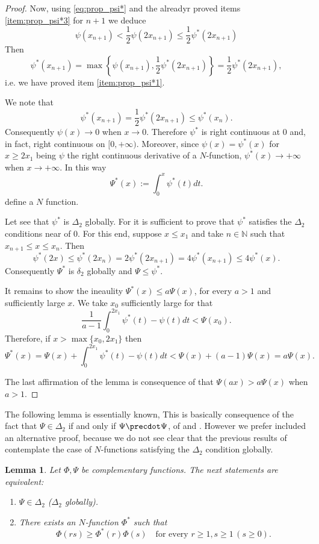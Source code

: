 \documentclass[twoside]{article}
\newtheorem{lem}[thm]{Lemma}
\theoremstyle{remark}
\renewcommand{\leq}{\leqslant}
\renewcommand{\geq}{\geqslant}
\begin{document}
\begin{proof}
Now, using \eqref{eq:prop_psi*} and the alreadyr proved items \ref{item:prop_psi*3} for $n+1$ we deduce
\[\psi(x_{n+1})<\frac12\psi(2x_{n+1})\leq \frac12\psi^*(2x_{n+1}) \]
Then
\[\psi^*(x_{n+1})=\max\left\{\psi(x_{n+1}),\frac12\psi^*(2x_{n+1}) \right\}=\frac12\psi^*(2x_{n+1}),\]
i.e. we have proved item \ref{item:prop_psi*1}.

We note that
\[\psi^*(x_{n+1})=\frac12\psi^*(2x_{n+1})\leq\psi^*(x_{n}).\]
Consequently $\psi(x)\to 0$ when $x\to 0$. Therefore $\psi^*$ is right continuous at $0$ and, in fact, right continuous on $[0,+\infty)$. Moreover, since $\psi(x)=\psi^*(x)$ for $x\geq 2x_1$ being $\psi$ the right continuous derivative of a $N$-function, $\psi^*(x)\to +\infty$ when $x\to +\infty$. In this way
\[\Psi^*(x):=\int_0^x\psi^*(t)dt.\]
define a $N$ function.

Let  see that $\psi^*$ is $\Delta_2$ globally.
For it is sufficient to prove that $\psi^*$ satisfies the $ \Delta_2$ conditions near of $0$. For this end, suppose $x\leq x_1$ and take $n\in\mathbb{N}$ such that $x_{n+1}\leq x\leq x_n$. Then
\[\psi^*(2x)\leq \psi^*(2x_n)=2\psi^*(2x_{n+1})=4\psi^*(x_{n+1})\leq 4\psi^*(x).\]
Consequently $\Psi^*$ is $\delta_2$ globally and $\Psi\leq \psi^*$.

It remains to show the ineaulity $\Psi^*(x)\leq a\Psi(x)$, for every $a>1$ and sufficiently large $x$. We take $x_0$ sufficiently large for that
\[\frac{1}{a-1}\int_0^{2x_1}\psi^*(t)-\psi(t)dt<\Psi(x_0).\]
Therefore, if  $x>\max\{x_0,2x_1\}$ then
\[\Psi^*(x)=\Psi(x)+\int_0^{2x_1}\psi^*(t)-\psi(t)dt<\Psi(x)+(a-1)\Psi(x)= a\Psi(x).\]

The last affirmation of the lemma is consequence of that  $\Psi(ax)>a\Psi(x)$ when $a>1$. 

\end{proof}



The following lemma is essentially known,  This is basically consequence  of the fact that $\Psi\in\Delta_2$ if and only if $\Psi\precdot\Psi$, of  \cite[Prop. 4, p. 20]{rao1991theory} and \cite[Cor. 10, p. 30]{rao1991theory}. However we prefer included an alternative proof, because we do not see clear that the previous results of \cite{rao1991theory} contemplate the case of $N$-functions satisfying the $\Delta_2$ condition globally.



\begin{lem}\label{lem:submultipliativa}
Let $\Phi,\Psi$ be complementary functions.
The next statements are equivalent:
\begin{enumerate}
\item\label{item1} $\Psi \in \Delta_2$ ($\Delta_2$ globally).
\item\label{item2} There exists an $N$-function $\Phi^*$ such that
\begin{equation}\label{eq:caract_delta2}
\Phi(rs)\geq \Phi^*(r)\Phi(s)\quad\mbox{for every }r\geq1,s\geq 1\, (s\geq 0).
\end{equation}
\end{enumerate}
\end{lem}
\end{document}
